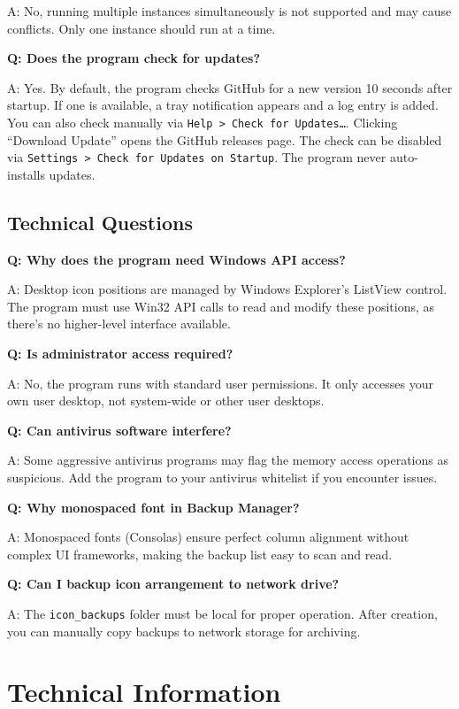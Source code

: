 \documentclass[a4paper,11pt]{article}
\begin{document}
A: No, running multiple instances simultaneously is not supported and
may cause conflicts. Only one instance should run at a time.

\textbf{Q: Does the program check for updates?}

A: Yes. By default, the program checks GitHub for a new version
10 seconds after startup. If one is available, a tray notification
appears and a log entry is added. You can also check manually via
\texttt{Help > Check for Updates\ldots}. Clicking ``Download Update''
opens the GitHub releases page. The check can be disabled via
\texttt{Settings > Check for Updates on Startup}.
The program never auto-installs updates.

\subsection{Technical Questions}

\textbf{Q: Why does the program need Windows API access?}

A: Desktop icon positions are managed by Windows Explorer's ListView
control. The program must use Win32 API calls to read and modify
these positions, as there's no higher-level interface available.

\textbf{Q: Is administrator access required?}

A: No, the program runs with standard user permissions. It only
accesses your own user desktop, not system-wide or other user desktops.

\textbf{Q: Can antivirus software interfere?}

A: Some aggressive antivirus programs may flag the memory access
operations as suspicious. Add the program to your antivirus whitelist
if you encounter issues.

\textbf{Q: Why monospaced font in Backup Manager?}

A: Monospaced fonts (Consolas) ensure perfect column alignment
without complex UI frameworks, making the backup list easy to scan and read.

\textbf{Q: Can I backup icon arrangement to network drive?}

A: The \texttt{icon\_backups} folder must be local for proper
operation. After creation, you can manually copy backups to network
storage for archiving.

\section{Technical Information}
\end{document}

